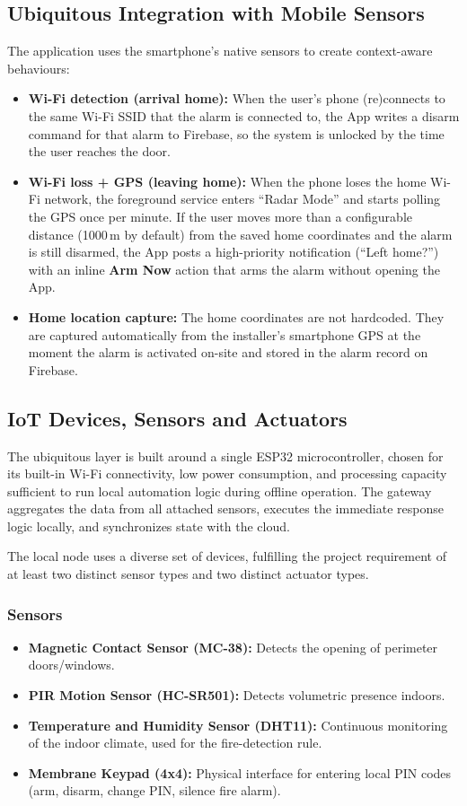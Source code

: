 \documentclass[10pt,twocolumn]{article}
\begin{document}
\subsection{Ubiquitous Integration with Mobile Sensors}
The application uses the smartphone's native sensors to create context-aware behaviours:
\begin{itemize}
    \item \textbf{Wi-Fi detection (arrival home):} When the user's phone (re)connects to the same Wi-Fi SSID that the alarm is connected to, the App writes a disarm command for that alarm to Firebase, so the system is unlocked by the time the user reaches the door.
    \item \textbf{Wi-Fi loss + GPS (leaving home):} When the phone loses the home Wi-Fi network, the foreground service enters ``Radar Mode'' and starts polling the GPS once per minute. If the user moves more than a configurable distance (1000\,m by default) from the saved home coordinates and the alarm is still disarmed, the App posts a high-priority notification (``Left home?'') with an inline \textbf{Arm Now} action that arms the alarm without opening the App.
    \item \textbf{Home location capture:} The home coordinates are not hardcoded. They are captured automatically from the installer's smartphone GPS at the moment the alarm is activated on-site and stored in the alarm record on Firebase.
\end{itemize}

\subsection{IoT Devices, Sensors and Actuators}
The ubiquitous layer is built around a single ESP32 microcontroller, chosen for its built-in Wi-Fi connectivity, low power consumption, and processing capacity sufficient to run local automation logic during offline operation. The gateway aggregates the data from all attached sensors, executes the immediate response logic locally, and synchronizes state with the cloud.

The local node uses a diverse set of devices, fulfilling the project requirement of at least two distinct sensor types and two distinct actuator types.

\subsubsection{Sensors}
\begin{itemize}
    \item \textbf{Magnetic Contact Sensor (MC-38):} Detects the opening of perimeter doors/windows.
    \item \textbf{PIR Motion Sensor (HC-SR501):} Detects volumetric presence indoors.
    \item \textbf{Temperature and Humidity Sensor (DHT11):} Continuous monitoring of the indoor climate, used for the fire-detection rule.
    \item \textbf{Membrane Keypad (4x4):} Physical interface for entering local PIN codes (arm, disarm, change PIN, silence fire alarm).
\end{itemize}
\end{document}
